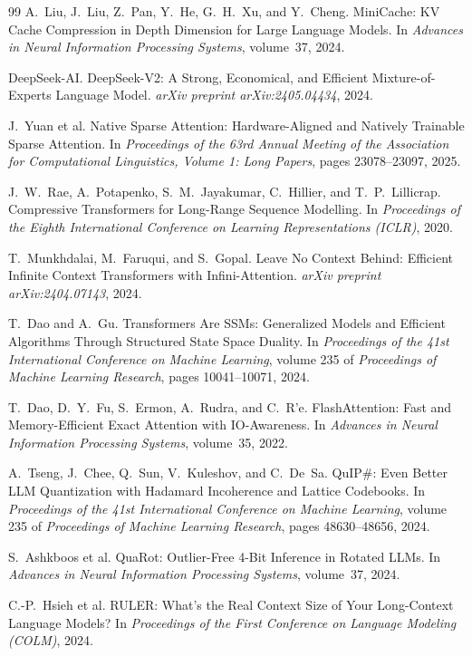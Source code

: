 \documentclass[10pt,twocolumn]{article}
\begin{document}
\begin{thebibliography}{99}
A.~Liu, J.~Liu, Z.~Pan, Y.~He, G.~H.~Xu, and Y.~Cheng.
MiniCache: KV Cache Compression in Depth Dimension for Large
Language Models.
In \emph{Advances in Neural Information Processing Systems},
volume~37, 2024.

DeepSeek-AI.
DeepSeek-V2: A Strong, Economical, and Efficient
Mixture-of-Experts Language Model.
\emph{arXiv preprint arXiv:2405.04434}, 2024.

J.~Yuan et al.
Native Sparse Attention: Hardware-Aligned and Natively
Trainable Sparse Attention.
In \emph{Proceedings of the 63rd Annual Meeting of the
Association for Computational Linguistics, Volume 1: Long
Papers}, pages 23078--23097, 2025.

J.~W.~Rae, A.~Potapenko, S.~M.~Jayakumar, C.~Hillier, and
T.~P.~Lillicrap.
Compressive Transformers for Long-Range Sequence Modelling.
In \emph{Proceedings of the Eighth International Conference on
Learning Representations (ICLR)}, 2020.

T.~Munkhdalai, M.~Faruqui, and S.~Gopal.
Leave No Context Behind: Efficient Infinite Context
Transformers with Infini-Attention.
\emph{arXiv preprint arXiv:2404.07143}, 2024.

T.~Dao and A.~Gu.
Transformers Are SSMs: Generalized Models and Efficient
Algorithms Through Structured State Space Duality.
In \emph{Proceedings of the 41st International Conference on
Machine Learning}, volume 235 of \emph{Proceedings of Machine
Learning Research}, pages 10041--10071, 2024.

T.~Dao, D.~Y.~Fu, S.~Ermon, A.~Rudra, and C.~R{'e}.
FlashAttention: Fast and Memory-Efficient Exact Attention with
IO-Awareness.
In \emph{Advances in Neural Information Processing Systems},
volume~35, 2022.

A.~Tseng, J.~Chee, Q.~Sun, V.~Kuleshov, and C.~De~Sa.
QuIP\#: Even Better LLM Quantization with Hadamard Incoherence
and Lattice Codebooks.
In \emph{Proceedings of the 41st International Conference on
Machine Learning}, volume 235 of \emph{Proceedings of Machine
Learning Research}, pages 48630--48656, 2024.

S.~Ashkboos et al.
QuaRot: Outlier-Free 4-Bit Inference in Rotated LLMs.
In \emph{Advances in Neural Information Processing Systems},
volume~37, 2024.

C.-P.~Hsieh et al.
RULER: What's the Real Context Size of Your Long-Context
Language Models?
In \emph{Proceedings of the First Conference on Language
Modeling (COLM)}, 2024.


\end{thebibliography}
\end{document}
